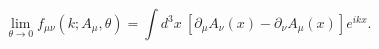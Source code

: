 \begin{equation}
  \lim_{\theta \to 0} f_{\mu \nu}(k; A_\mu, \theta)
  = \int d^3 x~ \left[ \partial_\mu A_\nu (x)
                     - \partial_\nu A_\mu (x) \right] e^{ikx}.
\label{initial-condition}
\end{equation}

